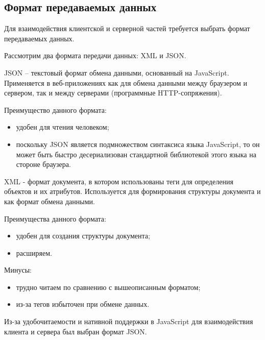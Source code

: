 
\subsection{Формат передаваемых данных}

Для взаимодействия клиентской и серверной частей требуется
выбрать формат передаваемых данных.

Рассмотрим два формата передачи данных: XML и JSON.

JSON – текстовый формат обмена данными, основанный на JavaScript.
Применяется в веб-приложениях как для обмена данными между браузером и
сервером, так и между серверами (программные HTTP-сопряжения).

Преимущество данного формата:
\begin{itemize}
	\item удобен для чтения человеком;
	\item поскольку JSON является подмножеством синтаксиса языка
	      JavaScript, то он может быть быстро десериализован стандартной библиотекой
	      этого языка на стороне браузера.
\end{itemize}

XML - формат документа, в котором использованы теги для определения
объектов и их атрибутов. Используется для формирования структуры
документа и как формат обмена данными.


Преимущества данного формата:
\begin{itemize}
	\item удобен для создания структуры документа;
	\item расширяем.
\end{itemize}
Минусы:
\begin{itemize}
	\item трудно читаем по сравнению с вышеописанным форматом;
	\item из-за тегов избыточен при обмене данных.
\end{itemize}

Из-за удобочитаемости и нативной поддержки в JavaScript для
взаимодействия клиента и сервера был выбран формат JSON.
